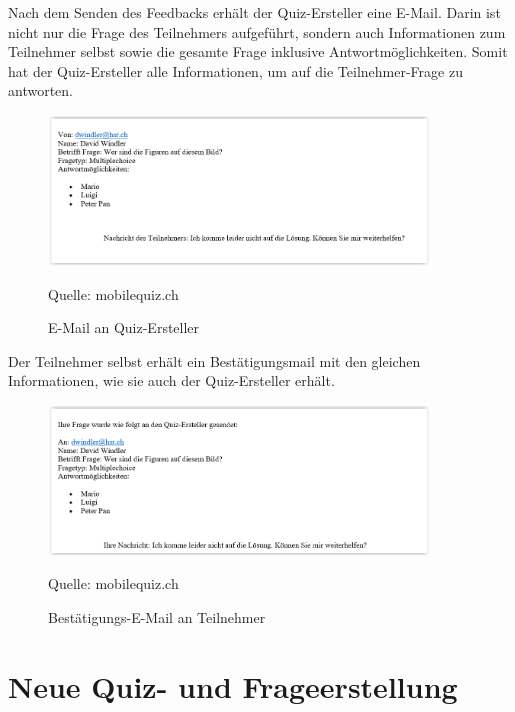 Nach dem Senden des Feedbacks erhält der Quiz-Ersteller eine E-Mail. Darin ist nicht nur die Frage des Teilnehmers aufgeführt, sondern auch Informationen zum Teilnehmer selbst sowie die gesamte Frage inklusive Antwortmöglichkeiten. Somit hat der Quiz-Ersteller alle Informationen, um auf die Teilnehmer-Frage zu antworten.

\begin{figure}[H]
	\centering
	\includegraphics[width=0.9\textwidth]{Images/Feedback-Mail_Quiz-Ersteller.PNG}
	\caption{E-Mail an Quiz-Ersteller}
	Quelle: mobilequiz.ch
\end{figure}

Der Teilnehmer selbst erhält ein Bestätigungsmail mit den gleichen Informationen, wie sie auch der Quiz-Ersteller erhält.

\begin{figure}[H]
	\centering
	\includegraphics[width=0.9\textwidth]{Images/Feedback-Mail_Teilnehmer.PNG}
	\caption{Bestätigungs-E-Mail an Teilnehmer}
	Quelle: mobilequiz.ch
\end{figure}




\section{Neue Quiz- und Frageerstellung}






